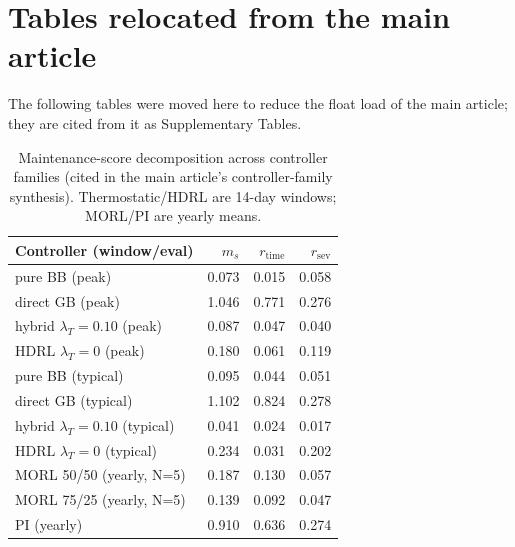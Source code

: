 \documentclass[11pt,a4paper]{article}
\begin{document}
\section*{Tables relocated from the main article}
The following tables were moved here to reduce the float load of the main article; they are cited from it as Supplementary Tables.
\begin{table}[H]
\centering
\caption{Maintenance-score decomposition across controller families (cited in the main article's controller-family synthesis). Thermostatic/HDRL are 14-day windows; MORL/PI are yearly means.}
\label{tab:msdecomp}
\small
\begin{tabular}{lrrr}
\toprule
Controller (window/eval) & $m_s$ & $r_{\mathrm{time}}$ & $r_{\mathrm{sev}}$ \\
\midrule
pure BB (peak) & 0.073 & 0.015 & 0.058 \\
direct GB (peak) & 1.046 & 0.771 & 0.276 \\
hybrid $\lambda_T{=}0.10$ (peak) & 0.087 & 0.047 & 0.040 \\
HDRL $\lambda_T{=}0$ (peak) & 0.180 & 0.061 & 0.119 \\
pure BB (typical) & 0.095 & 0.044 & 0.051 \\
direct GB (typical) & 1.102 & 0.824 & 0.278 \\
hybrid $\lambda_T{=}0.10$ (typical) & 0.041 & 0.024 & 0.017 \\
HDRL $\lambda_T{=}0$ (typical) & 0.234 & 0.031 & 0.202 \\
MORL 50/50 (yearly, N=5) & 0.187 & 0.130 & 0.057 \\
MORL 75/25 (yearly, N=5) & 0.139 & 0.092 & 0.047 \\
PI (yearly) & 0.910 & 0.636 & 0.274 \\
\bottomrule
\end{tabular}
\end{table}
\end{document}
